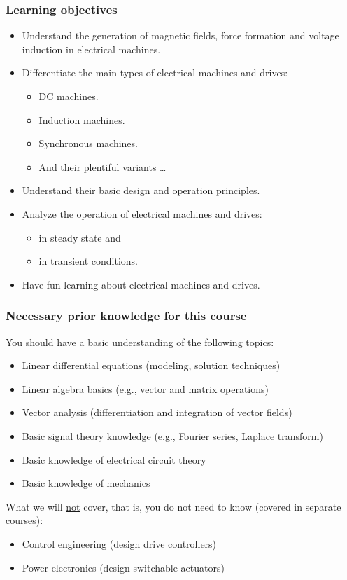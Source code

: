 \begin{frame}
	\frametitle{Learning objectives}
	\begin{itemize}
		\item Understand the generation of magnetic fields, force formation and voltage induction in electrical machines.
		\item<2-> Differentiate the main types of electrical machines and drives:
		\begin{itemize}
			\item DC machines. 
			\item Induction machines.
			\item Synchronous machines.
			\item And their plentiful variants \ldots
		\end{itemize}
		\item<3-> Understand their basic design and operation principles.
		\item<4-> Analyze the operation of electrical machines and drives:
		\begin{itemize}
			\item in steady state and
			\item in transient conditions.
		\end{itemize} 
		\item<5-> Have fun learning about electrical machines and drives.
	\end{itemize}
\end{frame}


\begin{frame}
	\frametitle{Necessary prior knowledge for this course}
	You should have a basic understanding of the following topics:
	\begin{itemize}
		\item Linear differential equations (modeling, solution techniques)
		\item Linear algebra basics (e.g., vector and matrix operations)
		\item Vector analysis (differentiation and integration of vector fields)
		\item Basic signal theory knowledge (e.g., Fourier series, Laplace transform)
		\item Basic knowledge of electrical circuit theory
		\item Basic knowledge of mechanics
	\end{itemize}
	\vspace{0.5cm}
	What we will \underline{not} cover, that is, you do not need to know (covered in separate courses):
	\begin{itemize}
		\item Control engineering (design drive controllers)
		\item Power electronics (design switchable actuators)
	\end{itemize}
\end{frame}

